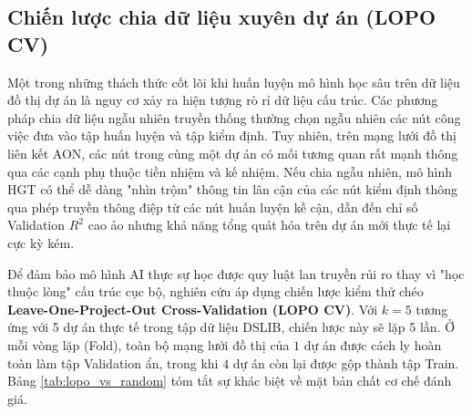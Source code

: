 \subsection{Chiến lược chia dữ liệu xuyên dự án (LOPO CV)}
\label{sec:3.2.1_lopo_cv}

Một trong những thách thức cốt lõi khi huấn luyện mô hình học sâu trên dữ liệu đồ thị dự án là nguy cơ xảy ra hiện tượng rò rỉ dữ liệu cấu trúc. Các phương pháp chia dữ liệu ngẫu nhiên truyền thống thường chọn ngẫu nhiên các nút công việc đưa vào tập huấn luyện và tập kiểm định. Tuy nhiên, trên mạng lưới đồ thị liên kết AON, các nút trong cùng một dự án có mối tương quan rất mạnh thông qua các cạnh phụ thuộc tiền nhiệm và kế nhiệm. Nếu chia ngẫu nhiên, mô hình HGT có thể dễ dàng "nhìn trộm" thông tin lân cận của các nút kiểm định thông qua phép truyền thông điệp từ các nút huấn luyện kề cận, dẫn đến chỉ số Validation $R^2$ cao ảo nhưng khả năng tổng quát hóa trên dự án mới thực tế lại cực kỳ kém.

Để đảm bảo mô hình AI thực sự học được quy luật lan truyền rủi ro thay vì "học thuộc lòng" cấu trúc cục bộ, nghiên cứu áp dụng chiến lược kiểm thử chéo \textbf{Leave-One-Project-Out Cross-Validation (LOPO CV)}. Với $k = 5$ tương ứng với 5 dự án thực tế trong tập dữ liệu DSLIB, chiến lược này sẽ lặp 5 lần. Ở mỗi vòng lặp (Fold), toàn bộ mạng lưới đồ thị của $1$ dự án được cách ly hoàn toàn làm tập Validation ẩn, trong khi $4$ dự án còn lại được gộp thành tập Train. Bảng \ref{tab:lopo_vs_random} tóm tắt sự khác biệt về mặt bản chất cơ chế đánh giá.

\begin{table}[H]
\centering
\caption{Đối chuẩn cơ chế đánh giá giữa Random Split và Leave-One-Project-Out (LOPO CV)}
\label{tab:lopo_vs_random}
\small
{}
\end{table}

